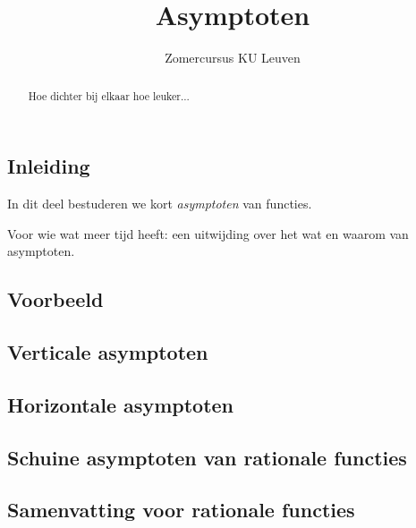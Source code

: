 \documentclass[numbers]{ximera}
\author{Zomercursus KU Leuven}
\title{Asymptoten}
\begin{document}
\begin{abstract}
	Hoe dichter bij elkaar hoe leuker...
\end{abstract}
\maketitle

\subsection{Inleiding}
In dit deel bestuderen we kort \textit{asymptoten} van functies.


\begin{expandable}
Voor wie wat meer tijd heeft: een uitwijding over het wat en waarom van asymptoten.


\end{expandable}



\subsection{Voorbeeld}
\subsection{Verticale asymptoten}
\subsection{Horizontale asymptoten}
\subsection{Schuine asymptoten van rationale functies}
\subsection{Samenvatting voor rationale functies}
\end{document}
